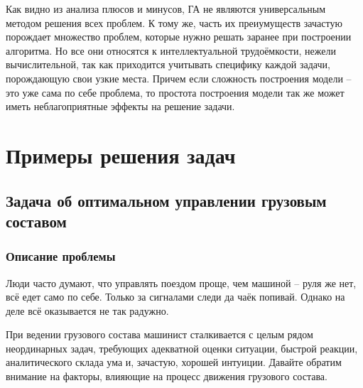Как видно из анализа плюсов и минусов, ГА не являются универсальным методом решения всех проблем. К тому же, часть их преиумуществ зачастую порождает множество проблем, которые нужно решать заранее при построении алгоритма. Но все они относятся к интеллектуальной трудоёмкости, нежели вычислительной, так как приходится учитывать специфику каждой задачи, порождающую свои узкие места. Причем если сложность построения модели -- это уже сама по себе проблема, то простота построения модели так же может иметь неблагоприятные эффекты на решение задачи.
\chapter{Примеры решения задач}
\section{Задача об оптимальном управлении грузовым составом}
\subsection{Описание проблемы}
Люди часто думают, что управлять поездом проще, чем машиной -- руля же нет, всё едет само по себе. Только за сигналами следи да чаёк попивай.
Однако на деле всё оказывается не так радужно.

При ведении грузового состава машинист сталкивается с целым рядом неординарных задач, требующих адекватной оценки ситуации, быстрой реакции, аналитического склада ума и, зачастую, хорошей интуиции.
Давайте обратим внимание на факторы, влияющие на процесс движения грузового состава.

